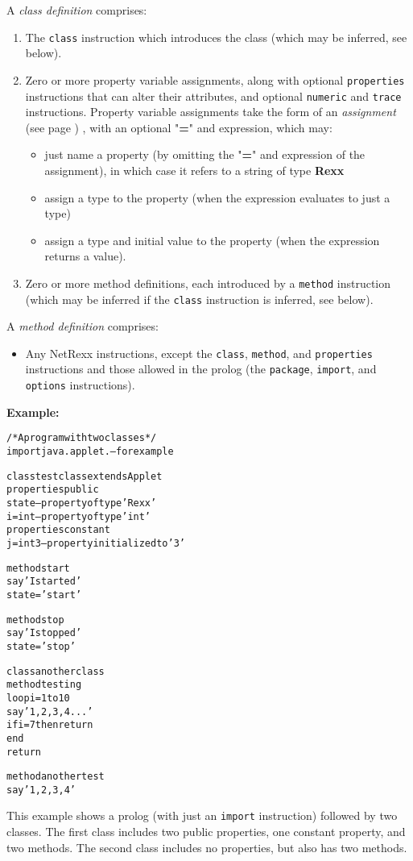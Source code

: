 A \emph{class definition} comprises:
\begin{enumerate}
\item The \texttt{class} instruction which introduces the class (which may
be inferred, see below).
\item 
Zero or more property variable assignments,
along with optional \texttt{properties}
instructions that can alter their attributes, and optional
\texttt{numeric} and \texttt{trace} instructions.
Property variable assignments take the form of an
 \emph{assignment} (see page \pageref{refassign}) , with an optional
"\textbf{=}" and expression, which may:
\begin{itemize}
\item just name a property (by omitting the "\textbf{=}"
and expression of the assignment), in which case it refers to a string of
type \textbf{Rexx}
\item assign a type to the property (when the expression evaluates to just
a type)
\item 
assign a type and initial value to the property (when the expression
returns a value).
\end{itemize}
\item Zero or more method definitions, each introduced by a
\texttt{method} instruction (which may be inferred if the \texttt{class}
instruction is inferred, see below).
\end{enumerate}
 
A \emph{method definition} comprises:
\begin{itemize}
\item 
Any NetRexx instructions, except the \texttt{class}, \texttt{method},
and \texttt{properties} instructions and those allowed in the prolog
(the \texttt{package}, \texttt{import}, and \texttt{options}
instructions).
\end{itemize}
 \textbf{Example:}
\begin{alltt}
/* A program with two classes */
import java.applet.   -- for example

class testclass extends Applet
  properties public
    state             -- property of type 'Rexx'
    i=int             -- property of type 'int'
  properties constant
    j=int 3           -- property initialized to '3'

  method start
    say 'I started'
    state='start'

  method stop
    say 'I stopped'
    state='stop'

class anotherclass
  method testing
    loop i=1 to 10
      say '1, 2, 3, 4...'
      if i=7 then return
     end
    return

  method anothertest
    say '1, 2, 3, 4'
\end{alltt}
This example shows a prolog (with just an \texttt{import}
instruction) followed by two classes.  The first class includes
two public properties, one constant property, and two methods.
The second class includes no properties, but also has two methods.
 
